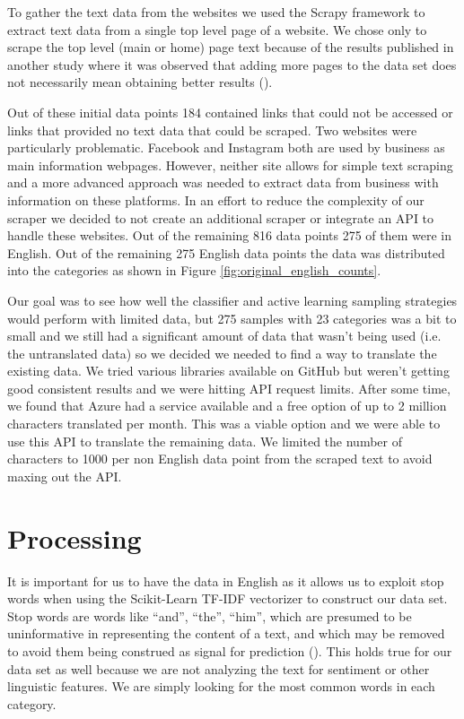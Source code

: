 To gather the text data from the websites we used the Scrapy framework to extract text data from a single top level page of a website. We chose only to scrape the top level (main or home) page text because of the results published in another study where it was observed that adding more pages to the data set does not necessarily mean obtaining better results (\cite{sahid2019ecommerce}). 

Out of these initial data points 184 contained links that could not be accessed or links that provided no text data that could be scraped. Two websites were particularly problematic. Facebook and Instagram both are used by business as main information webpages. However, neither site allows for simple text scraping and a more advanced approach was needed to extract data from business with information on these platforms. In an effort to reduce the complexity of our scraper we decided to not create an additional scraper or integrate an API to handle these websites. Out of the remaining 816 data points 275 of them were in English. Out of the remaining 275 English data points the data was distributed into the categories as shown in Figure \ref{fig:original_english_counts}.

Our goal was to see how well the classifier and active learning sampling strategies would perform with limited data, but 275 samples with 23 categories was a bit to small and we still had a significant amount of data that wasn't being used (i.e. the untranslated data) so we decided we needed to find a way to translate the existing data. We tried various libraries available on GitHub but weren't getting good consistent results and we were hitting API request limits. After some time, we found that Azure had a service available and a free option of up to 2 million characters translated per month. This was a viable option and we were able to use this API to translate the remaining data. We limited the number of characters to 1000 per non English data point from the scraped text to avoid maxing out the API.

\section{Processing}

It is important for us to have the data in English as it allows us to exploit stop words when using the Scikit-Learn TF-IDF vectorizer to construct our data set. Stop words are words like “and”, “the”, “him”, which are presumed to be uninformative in representing the content of a text, and which may be removed to avoid them being construed as signal for prediction (\cite{sklearn62feature}). This holds true for our data set as well because we are not analyzing the text for sentiment or other linguistic features. We are simply looking for the most common words in each category.

